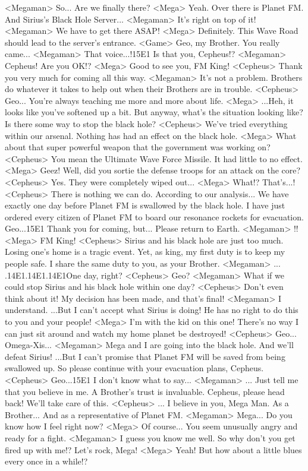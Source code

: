 <Megaman> So... Are we finally there? 
<Mega> Yeah. Over there is Planet FM. 
And Sirius's Black Hole Server... 
<Megaman> It's right on top of it! 
<Megaman> We have to get there ASAP! 
<Mega> Definitely. This Wave Road should lead to the server's entrance. 
<Game> Geo, my Brother. You really came... 
<Megaman> That voice...!{15}{E1} Is that you, Cepheus!? 
<Megaman> Cepheus! Are you OK!? 
<Mega> Good to see you, FM King! 
<Cepheus> Thank you very much for coming all this way. 
<Megaman> It's not a problem. 
Brothers do whatever it takes to help out when their Brothers are in trouble. 
<Cepheus> Geo... You're always teaching me more and more about life. 
<Mega> ...Heh, it looks like you've softened up a bit. 
But anyway, what's the situation looking like? 
Is there some way to stop the black hole? 
<Cepheus> We've tried everything within our arsenal. 
Nothing has had an effect on the black hole. 
<Mega> What about that super powerful weapon that the government was working on? 
<Cepheus> You mean the Ultimate Wave Force Missile. It had little to no effect. 
<Mega> Geez! 
Well, did you sortie the defense troops for an attack on the core? 
<Cepheus> Yes. They were completely wiped out... 
<Mega> What!? That's...! 
<Cepheus> There is nothing we can do. 
According to our analysis... We have exactly one day 
before Planet FM is swallowed by the black hole. 
I have just ordered every citizen of Planet FM to 
board our resonance rockets for evacuation. 
Geo...{15}{E1} Thank you for coming, but... Please return to Earth. 
<Megaman> !! 
<Mega> FM King! 
<Cepheus> Sirius and his black hole are just too much. 
Losing one's home is a tragic event. 
Yet, as king, my first duty is to keep my people safe. 
I share the same duty to you, as your Brother. 
<Megaman> ... 
.{14}{E1}.{14}{E1}.{14}{E1}One day, right? 
<Cepheus> Geo? 
<Megaman> What if we could stop Sirius and his black hole within one day? 
<Cepheus> Don't even think about it! My decision has been made, and that's final! 
<Megaman> I understand. ...But I can't accept what Sirius is doing! 
He has no right to do this to you and your people! 
<Mega> I'm with the kid on this one! 
There's no way I can just sit around and watch my home planet be destroyed! 
<Cepheus> Geo... Omega-Xis... 
<Megaman> Mega and I are going into the black hole. 
And we'll defeat Sirius! 
...But I can't promise that Planet FM will be saved from being swallowed up. 
So please continue with your evacuation plans, Cepheus. 
<Cepheus> Geo...{15}{E1} I don't know what to say... 
<Megaman> ... 
Just tell me that you believe in me. A Brother's trust is invaluable. 
Cepheus, please head back! We'll take care of this. 
<Cepheus> ... 
I believe in you, Mega Man. 
As a Brother... And as a representative of Planet FM. 
<Megaman> Mega... 
Do you know how I feel right now? 
<Mega> Of course... You seem unusually angry and ready for a fight. 
<Megaman> I guess you know me well. 
So why don't you get fired up with me!? 
Let's rock, Mega! 
<Mega> Yeah! But how about a little blues every once in a while!? 
